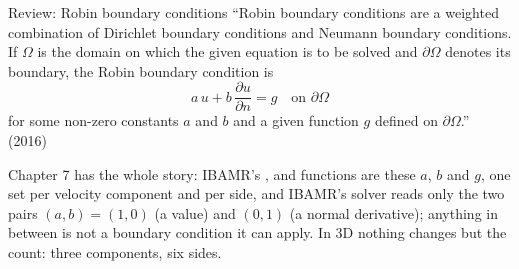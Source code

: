 \documentclass[aspectratio=169,11pt]{beamer}
\begin{document}
\begin{frame}{Review: Robin boundary conditions}
\label{fr:robin}
\small ``Robin boundary conditions are a weighted combination of Dirichlet boundary conditions and Neumann boundary conditions. If $\Omega$ is the domain on which the given equation is to be solved and $\partial\Omega$ denotes its boundary, the Robin boundary condition is
\[
  a\,u + b\,\frac{\partial u}{\partial n} = g \quad\text{on } \partial\Omega
\]
for some non-zero constants $a$ and $b$ and a given function $g$ defined on $\partial\Omega$.'' (2016)
\vspace{2mm}

\footnotesize Chapter 7 has the whole story: IBAMR's ,  and  functions are these $a$, $b$ and $g$, one set per velocity component and per side, and IBAMR's solver reads only the two pairs $(a, b) = (1, 0)$ (a value) and $(0, 1)$ (a normal derivative); anything in between is not a boundary condition it can apply. In 3D nothing changes but the count: three components, six sides.
\end{frame}
\end{document}
